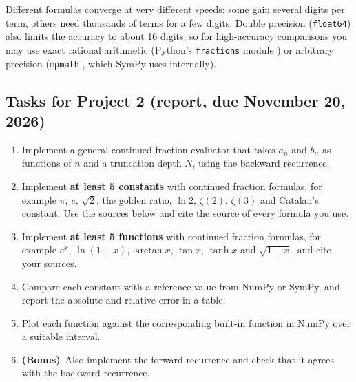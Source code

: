 \documentclass[11pt,a4paper]{article}
\newcommand{\bonus}{\textbf{(Bonus)}}
\begin{document}
Different formulas converge at very different speeds: some gain several
digits per term, others need thousands of terms for a few digits. Double
precision (\texttt{float64}) also limits the accuracy to about 16 digits, so
for high-accuracy comparisons you may use exact rational arithmetic (Python's
\texttt{fractions} module \cite{fractions}) or arbitrary precision
(\texttt{mpmath} \cite{mpmath}, which SymPy uses internally).

\subsection*{Tasks for Project 2 (report, due November 20, 2026)}
\begin{enumerate}
  \item Implement a general continued fraction evaluator that takes $a_n$ and
        $b_n$ as functions of $n$ and a truncation depth $N$, using the
        backward recurrence.
  \item Implement \textbf{at least 5 constants} with continued fraction
        formulas, for example $\pi$, $e$, $\sqrt{2}$, the golden ratio,
        $\ln 2$, $\zeta(2)$, $\zeta(3)$ and Catalan's constant. Use the
        sources below \cite{brouncker,baez,catalan,euler,results} and cite the
        source of every formula you use.
  \item Implement \textbf{at least 5 functions} with continued fraction
        formulas, for example $e^x$, $\ln(1+x)$, $\arctan x$, $\tan x$,
        $\tanh x$ and $\sqrt{1+x}$, and cite your sources.
  \item Compare each constant with a reference value from NumPy or SymPy,
        and report the absolute and relative error in a table.
  \item Plot each function against the corresponding built-in function in
        NumPy over a suitable interval.
  \item \bonus\ Also implement the forward recurrence and check that it
        agrees with the backward recurrence.
\end{enumerate}
\end{document}
